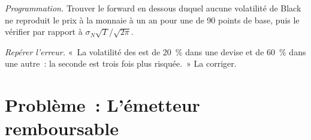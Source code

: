 \begin{exercise}[$\star\star\star$]\label{exo:m2:the-rates-options-market:7}
\emph{Programmation.} Trouver le forward en dessous duquel aucune volatilité de Black ne reproduit
le prix à la monnaie à un an pour une  de 90 points de base, puis le vérifier
par rapport à $\sigma_N\sqrt T/\sqrt{2\pi}$.
\end{exercise}

\begin{exercise}[$\star\star\star$]\label{exo:m2:the-rates-options-market:8}
\emph{Repérer l'erreur.} «~La volatilité des  est de 20~\% dans une devise et de 60~\% dans
une autre~: la seconde est trois fois plus risquée.~» La corriger.
\end{exercise}

\section{Problème~: L'émetteur remboursable}

